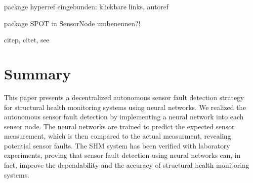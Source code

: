 \documentclass[12pt,a4paper]{scrartcl}
\begin{document}
package hyperref eingebunden: klickbare links, autoref

package SPOT in SensorNode umbenennen?!

citep, citet, see

\section*{Summary}

This paper presents a decentralized autonomous sensor fault detection strategy for structural health monitoring systems using neural networks. 
We realized the autonomous sensor fault detection by implementing a neural network into each sensor node.
The neural networks are trained to predict the expected sensor measurement, which is then compared to the actual measurment, revealing potential sensor faults.
The SHM system has been verified with laboratory experiments, proving that sensor fault detection using neural networks can, in fact, improve the dependability and the accuracy of structural health monitoring systems.




\end{document}
